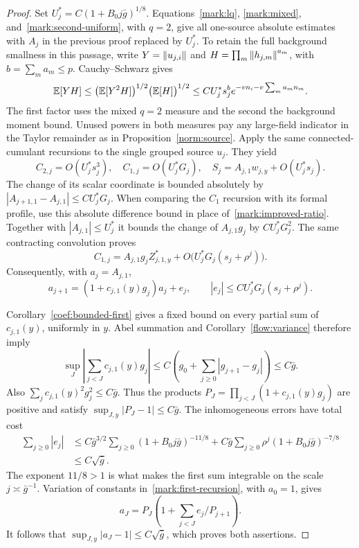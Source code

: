 \begin{proof}
Set $U_j^*=C(1+B_0j\bar g)^{1/8}$.  Equations~\eqref{mark:lq},
\eqref{mark:mixed}, and~\eqref{mark:second-uniform}, with $q=2$, give
all one-source absolute estimates with $A_j$ in the previous proof
replaced by $U_j^*$.  To retain the full background smallness in this
passage, write $Y=\left\lVert u_{j,i}\right\rVert$ and
$H=\prod_m\left\lVert h_{j,m}\right\rVert^{a_m}$, with $b=\sum_m a_m\le p$.
Cauchy--Schwarz gives
\[
 \mathbb E[YH]\le\bigl(\mathbb E[Y^2H]\bigr)^{1/2}
               \bigl(\mathbb E[H]\bigr)^{1/2}
 \le C U_j^*s_j^b e^{-vn_i-v\sum_m a_mn_m}.
\]
The first factor uses the mixed $q=2$ measure and the second the
background moment bound.  Unused powers in both measures pay any
large-field indicator in the Taylor remainder as in
Proposition~\ref{norm:source}.  Apply the same connected-cumulant recursions to the
single grouped source $u_j$.  They yield
\[
 C_{2,j}=O(U_j^*s_j^3),\quad C_{1,j}=O(U_j^*G_j),\quad
 S_j=A_{j,1}w_{j,y}+O(U_j^*s_j).
\]
The change of its scalar coordinate is bounded absolutely by
$|A_{j+1,1}-A_{j,1}|\le CU_j^*G_j$.
When comparing the $C_1$ recursion with its formal profile, use this
absolute difference bound in place of~\eqref{mark:improved-ratio}.
Together with $|A_{j,1}|\le U_j^*$ it bounds the change of
$A_{j,1}g_j$ by $CU_j^*G_j^2$.  The same contracting convolution proves
\[
 C_{1,j}=A_{j,1}g_jZ_{j,1,y}^*
               +O\bigl(U_j^*G_j(s_j+\rho^j)\bigr).
\]
Consequently, with $a_j=A_{j,1}$,
\begin{equation}\label{mark:first-recursion}
 a_{j+1}=(1+c_{j,1}(y)g_j)a_j+e_j,
 \qquad |e_j|\le CU_j^*G_j(s_j+\rho^j).
\end{equation}

Corollary~\ref{coef:bounded-first} gives a fixed bound on every
partial sum of $c_{j,1}(y)$, uniformly in $y$.  Abel summation and
Corollary~\ref{flow:variance} therefore imply
\[
 \sup_J\left|\sum_{j<J}c_{j,1}(y)g_j\right|
 \le C\left(g_0+\sum_{j\ge0}|g_{j+1}-g_j|\right)
 \le C\bar g.
\]
Also $\sum_jc_{j,1}(y)^2g_j^2\le C\bar g$.
Thus the products
$P_J=\prod_{j<J}(1+c_{j,1}(y)g_j)$ are positive and satisfy
$\sup_{J,y}|P_J-1|\le C\bar g$.
The inhomogeneous errors have total cost
\begin{align*}
 \sum_{j\ge0}|e_j|
 &\le C\bar g^{3/2}\sum_{j\ge0}
             (1+B_0j\bar g)^{-11/8}
       +C\bar g\sum_{j\ge0}\rho^j
             (1+B_0j\bar g)^{-7/8}\\
 &\le C\sqrt{\bar g}.
\end{align*}
The exponent $11/8>1$ is what makes the first sum integrable on the
scale $j\asymp\bar g^{-1}$.
Variation of constants in~\eqref{mark:first-recursion}, with $a_0=1$,
gives
\[
 a_J=P_J\left(1+\sum_{j<J}e_j/P_{j+1}\right).
\]
It follows that $\sup_{J,y}|a_J-1|\le C\sqrt{\bar g}$, which proves
both assertions.
\end{proof}
